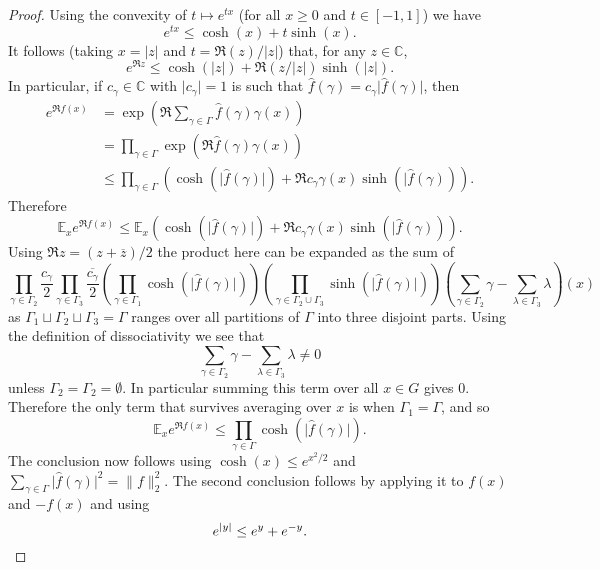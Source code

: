 \begin{proof}
Using the convexity of $t\mapsto e^{tx}$ (for all $x\geq 0$ and $t\in[-1,1]$) we have
\[e^{tx}\leq \cosh(x)+t\sinh(x).\]
It follows (taking $x=\lvert z\rvert$ and $t=\Re(z)/\lvert z\rvert$) that, for any $z\in \mathbb{C}$,
\[e^{\Re z}\leq \cosh(\lvert z\rvert)+\Re(z/\lvert z\rvert)\sinh(\lvert z\rvert).\]
In particular, if $c_\gamma\in \mathbb{C}$ with $\lvert c_\gamma\rvert=1$ is such that $\widehat{f}(\gamma)=c_\gamma\lvert \widehat{f}(\gamma)\rvert$, then
\begin{align*}
e^{\Re f(x)}
&= \exp\left( \Re \sum_{\gamma\in\Gamma}\widehat{f}(\gamma)\gamma(x)\right)\\
&=\prod_{\gamma\in \Gamma} \exp\left( \Re \widehat{f}(\gamma)\gamma(x)\right)\\
&\leq \prod_{\gamma\in \Gamma}\left( \cosh(\lvert \widehat{f}(\gamma)\rvert)+\Re c_\gamma \gamma(x)\sinh(\lvert \widehat{f}(\gamma))\right).
\end{align*}
Therefore
\[\mathbb{E}_x e^{\Re f(x)}\leq \mathbb{E}_x \left( \cosh(\lvert \widehat{f}(\gamma)\rvert)+\Re c_\gamma \gamma(x)\sinh(\lvert \widehat{f}(\gamma))\right).\]
Using $\Re z=(z+\overline{z})/2$ the product here can be expanded as the sum of
\[\prod_{\gamma\in \Gamma_2}\frac{c_\gamma}{2}\prod_{\gamma\in \Gamma_3}\frac{\overline{c_\gamma}}{2}\left(\prod_{\gamma\in \Gamma_1}\cosh(\lvert \widehat{f}(\gamma)\rvert)\right)\left(\prod_{\gamma\in \Gamma_2\cup\Gamma_3}\sinh(\lvert \widehat{f}(\gamma)\rvert)\right)\left(\sum_{\gamma\in \Gamma_2}\gamma-\sum_{\lambda\in \Gamma_3}\lambda\right)(x)\]
as $\Gamma_1\sqcup \Gamma_2\sqcup \Gamma_3=\Gamma$ ranges over all partitions of $\Gamma$ into three disjoint parts. Using the definition of dissociativity we see that
\[\sum_{\gamma\in \Gamma_2}\gamma-\sum_{\lambda\in \Gamma_3}\lambda\neq 0\]
unless $\Gamma_2=\Gamma_2=\emptyset$. In particular summing this term over all $x\in G$ gives $0$. Therefore the only term that survives averaging over $x$ is when $\Gamma_1=\Gamma$, and so
\[\mathbb{E}_x e^{\Re f(x)}\leq \prod_{\gamma\in \Gamma} \cosh (\lvert \widehat{f}(\gamma)\rvert).\]
The conclusion now follows using $\cosh(x) \leq e^{x^2/2}$ and $\sum_{\gamma\in \Gamma}\lvert \widehat{f}(\gamma)\rvert^2=\| f\|_2^2$. The second conclusion follows by applying it to $f(x)$ and $-f(x)$ and using
\[e^{\left\lvert y\right\rvert}\leq e^y+e^{-y}.\]
\end{proof}


